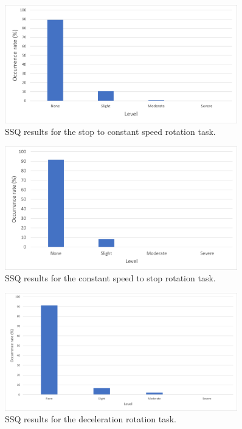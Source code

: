 \begin{figure}[H]\centering
	\includegraphics[width=0.9\textwidth]{Pictures/SSQ_StoC_Of_RorationEx.png}%
	\caption{SSQ results for the stop to constant speed rotation task.}\label{fig:SSQ_StoC_Of_RorationEx}%
	
\end{figure}
\begin{figure}[H]\centering
	\includegraphics[width=0.9\textwidth]{Pictures/SSQ_CtoS_Of_RorationEx.png}%
	\caption{SSQ results for the constant speed to stop rotation task.}\label{fig:SSQ_CtoS_Of_RorationEx}%
	
\end{figure}
\begin{figure}[H]\centering
	\includegraphics[width=0.9\textwidth]{Pictures/SSQ_Dec_Of_RotationEx.png}%
	\caption{SSQ results for the deceleration rotation task.}\label{fig:SSQ_Dec_Of_RotationEx}%
	
\end{figure}
